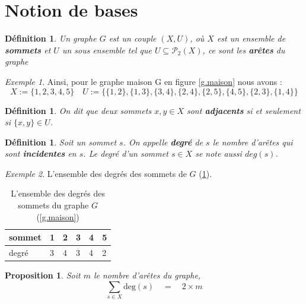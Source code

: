 \documentclass[12pt,a4paper]{scrartcl}
\theoremstyle{plain}
\newtheorem{proposition}[theoreme]{Proposition}
\newtheorem{definition}[theoreme]{Définition}
\theoremstyle{remark}
\newtheorem*{exemple}{Exemple}
\begin{document}
\section{Notion de bases}

\begin{definition}
Un graphe $G$ est un couple $(X,U)$, où $X$ est un ensemble de \textbf{sommets} et
$U$ un sous ensemble tel que $U \subseteq \mathcal{P}_2(X)$, ce sont les \textbf{arêtes} du graphe 
\end{definition}

\begin{exemple}
	Ainsi, pour le graphe maison G en figure \ref{g.maison} nous avons :
\[X:= \{ 1,2,3,4,5 \}\quad
U:= \{ \{1,2\},\{1,3\},\{3,4\},\{2,4\},\{2,5\},\{4,5\},\{2,3\},\{1,4\} \}\]	
\end{exemple}

\begin{definition}
	On dit que deux sommets $x,y \in X$ sont \textbf{adjacents} si et seulement si $\{x,y\} \in U$.
\end{definition}

\begin{definition}
	Soit un sommet $s$. On appelle \textbf{degré} de $s$ le nombre d'arêtes qui sont \textbf{incidentes} en $s$. Le degré d'un sommet $s \in X$ se note aussi $deg(s)$.
\end{definition}

\begin{exemple}
	L'ensemble des degrés des sommets de $G$ (\ref{t.deg}).
\end{exemple}

\begin{table}[tbp]
	\centering
	\begin{tabular}{|l|l|l|l|l|l|}
	\hline
	sommet & 1 & 2 & 3 & 4 & 5 \\
	\hline
	degré  & 3 & 4 & 3 & 4 & 2 \\
	\hline
	\end{tabular}
	\caption{L'ensemble des degrés des sommets du graphe $G$ (\ref{g.maison})}\label{t.deg}
	\end{table}

\begin{proposition}
	Soit $m$ le nombre d'arêtes du graphe,
	\begin{equation}
		\sum_{s \in X} \text{deg}(s)\quad=\quad 2\times m
	\end{equation}\label{eq.degsum}
		
\end{proposition}
\end{document}
